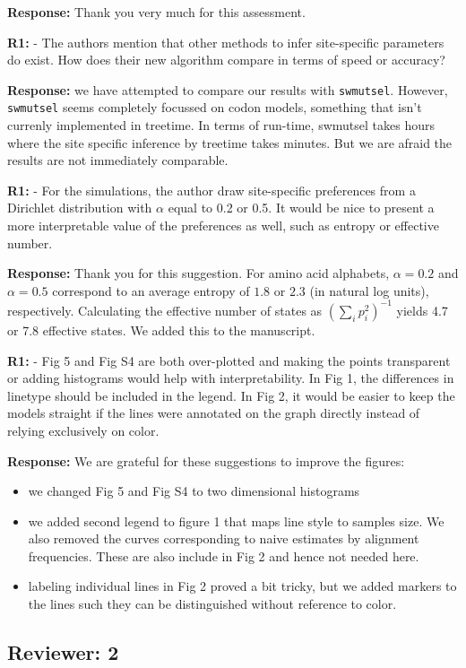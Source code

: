 \documentclass[aps,rmp,onecolumn]{revtex4-1}
\newcommand{\refa}[1]{\textbf{R1:} #1}
\newcommand{\response}[1]{{\color{black}\textbf{Response:} #1}}
\begin{document}
\response{Thank you very much for this assessment.}

\refa{- The authors mention that other methods to infer site-specific parameters do exist. How does their new algorithm compare in terms of speed or accuracy?}

\response{we have attempted to compare our results with
\texttt{swmutsel}. However, \texttt{swmutsel} seems completely focussed on codon models, something that isn't currenly implemented in treetime. In terms of run-time, swmutsel takes hours where the site specific inference by treetime takes minutes.
But we are afraid the results are not immediately comparable. }


\refa{- For the simulations, the author draw site-specific preferences from a Dirichlet distribution with $\alpha$ equal to 0.2 or 0.5. It would be nice to present a more interpretable value of the preferences as well, such as entropy or effective number.}

\response{
Thank you for this suggestion.
For amino acid alphabets, $\alpha=0.2$ and $\alpha=0.5$ correspond to an average entropy of $1.8$ or $2.3$ (in natural log units), respectively.
Calculating the effective number of states as $\left(\sum_i p_i^2\right)^{-1}$ yields 4.7 or 7.8 effective states.
We added this to the manuscript.}


\refa{- Fig 5 and Fig S4 are both over-plotted and making the points transparent or adding histograms would help with interpretability. In Fig 1, the differences in linetype should be included in the legend. In Fig 2, it would be easier to keep the models straight if the lines were annotated on the graph directly instead of relying exclusively on color.}

\response{
We are grateful for these suggestions to improve the figures:
\begin{itemize}
    \item we changed Fig 5 and Fig S4 to two dimensional histograms
    \item we added second legend to figure 1 that maps line style to samples size. We also removed the curves corresponding to naive estimates by alignment frequencies. These are also include in Fig 2 and hence not needed here.
    \item labeling individual lines in Fig 2 proved a bit tricky, but we added markers to the lines such they can be distinguished without reference to color.
\end{itemize}
}


\subsection*{Reviewer: 2}
\end{document}
